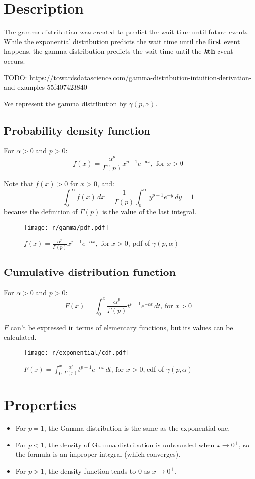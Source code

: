 \section{Description}

The gamma distribution was created to predict the wait time until future events. While the exponential distribution
predicts the wait time until the \textbf{first} event happens, the gamma distribution predicts the wait time until the
\textbf{\textit{k}th} event occurs.

TODO: https://towardsdatascience.com/gamma-distribution-intuition-derivation-and-examples-55f407423840

We represent the gamma distribution by $\gamma(p, \alpha)$.

\subsection{Probability density function}
For $\alpha > 0$ and $p > 0$:
\[
	f(x) = \frac{\alpha^p}{\Gamma(p)} x^{p - 1} e^{-\alpha x}, \text{ for } x > 0
\]

Note that $f(x) > 0$ for $x > 0$, and:
\[
	\int_0^\infty f(x) \, dx = \frac{1}{\Gamma(p)} \int_0^\infty y^{p - 1} e^{-y} \, dy= 1
\]
because the definition of $\Gamma(p)$ is the value of the last integral.

\begin{figure}[H]
	\texttt{[image: r/gamma/pdf.pdf]}
	\caption{$f(x) = \frac{\alpha^p}{\Gamma(p)} x^{p - 1} e^{-\alpha x}, \text{ for } x > 0$, pdf of $\gamma(p, \alpha)$}
\end{figure}


\subsection{Cumulative distribution function}
For $\alpha > 0$ and $p > 0$:
\[
	F(x) = \int_0^x \frac{\alpha^p}{\Gamma(p)} t^{p - 1} e^{-\alpha t} \, dt \text{, for } x > 0
\]

$F$ can't be expressed in terms of elementary functions, but its values can be calculated.

\begin{figure}[H]
	\texttt{[image: r/exponential/cdf.pdf]}
	\caption{$F(x) = \int_0^x \frac{\alpha^p}{\Gamma(p)} t^{p - 1} e^{-\alpha t} \, dt \text{, for } x > 0$, cdf of $\gamma(p, \alpha)$}
\end{figure}

\section{Properties}
\begin{itemize}
	\item For $p = 1$, the Gamma distribution is the same as the exponential one.
	\item For $p < 1$, the density of Gamma distribution is unbounded when $x \rightarrow 0^+$, so the formula is an improper integral (which converges).
	\item For $p > 1$, the density function tends to 0 as $x \rightarrow 0^+$.
\end{itemize}


